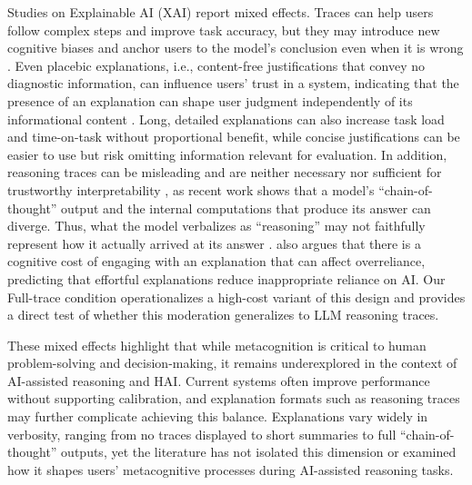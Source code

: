 \documentclass[manuscript,review,anonymous]{acmart}
\begin{document}
Studies on Explainable AI (XAI) report mixed effects. Traces can help users follow complex steps and improve task accuracy, but they may introduce new cognitive biases \cite{bertrand2022cognitive} and anchor users to the model's conclusion even when it is wrong \cite{10.1145/3397481.3450639}. Even placebic explanations, i.e., content-free justifications that convey no diagnostic information, can influence users' trust in a system, indicating that the presence of an explanation can shape user judgment independently of its informational content \cite{eiband2019impact}. Long, detailed explanations can also increase task load and time-on-task without proportional benefit, while concise justifications can be easier to use but risk omitting information relevant for evaluation.
In addition, reasoning traces can be misleading and are neither necessary nor sufficient for trustworthy interpretability \cite{barez2025chain}, as recent work shows that a model's ``chain-of-thought'' output and the internal computations that produce its answer can diverge. Thus, what the model verbalizes as ``reasoning'' may not faithfully represent how it actually arrived at its answer \cite{lindsey2025biology, 10.5555/3666122.3669397}.
\citet{vasconcelos2023explanations} also argues that there is a cognitive cost of engaging with an explanation that can affect overreliance, predicting that effortful explanations reduce inappropriate reliance on AI. Our Full-trace condition operationalizes a high-cost variant of this design and provides a direct test of whether this moderation generalizes to LLM reasoning traces.

These mixed effects highlight that while metacognition is critical to human problem-solving and decision-making, it remains underexplored in the context of AI-assisted reasoning and HAI. Current systems often improve performance without supporting calibration, and explanation formats such as reasoning traces may further complicate achieving this balance. Explanations vary widely in verbosity, ranging from no traces displayed to short summaries to full ``chain-of-thought'' outputs, yet the literature has not isolated this dimension or examined how it shapes users' metacognitive processes during AI-assisted reasoning tasks.
\end{document}
